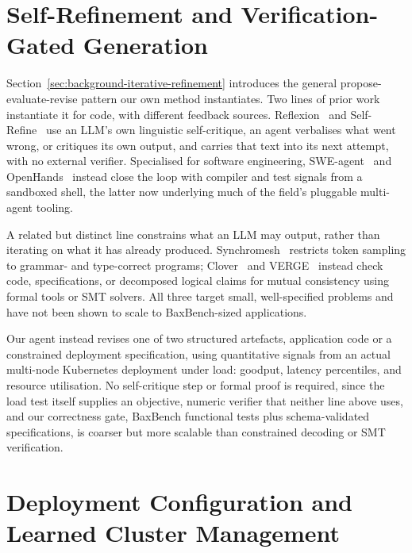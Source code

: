 \section{Self-Refinement and Verification-Gated Generation}
\label{sec:rw-agentic}

Section~\ref{sec:background-iterative-refinement} introduces the general
propose-evaluate-revise pattern our own method instantiates.  Two lines of
prior work instantiate it for code, with different feedback sources.
Reflexion~\cite{shinn2023reflexion} and Self-Refine~\cite{madaan2023selfrefine}
use an LLM's own linguistic self-critique, an agent verbalises what went
wrong, or critiques its own output, and carries that text into its next
attempt, with no external verifier.  Specialised for software engineering,
SWE-agent~\cite{yang2024sweagent} and OpenHands~\cite{wang2024openhands}
instead close the loop with compiler and test signals from a sandboxed
shell, the latter now underlying much of the field's pluggable multi-agent
tooling.

A related but distinct line constrains what an LLM may output, rather than
iterating on what it has already produced.
Synchromesh~\cite{poesia2022synchromesh} restricts token sampling to
grammar- and type-correct programs; Clover~\cite{sun2023clover} and
VERGE~\cite{singh2026verge} instead check code, specifications, or
decomposed logical claims for mutual consistency using formal tools or SMT
solvers.  All three target small, well-specified problems and have not been
shown to scale to BaxBench-sized applications.

Our agent instead revises one of two structured artefacts, application code
or a constrained deployment specification, using quantitative signals from
an actual multi-node Kubernetes deployment under load: goodput, latency
percentiles, and resource utilisation.  No self-critique step or formal
proof is required, since the load test itself supplies an objective, numeric
verifier that neither line above uses, and our correctness gate, BaxBench
functional tests plus schema-validated specifications, is coarser but more
scalable than constrained decoding or SMT verification.


\section{Deployment Configuration and Learned Cluster Management}
\label{sec:rw-cluster}

